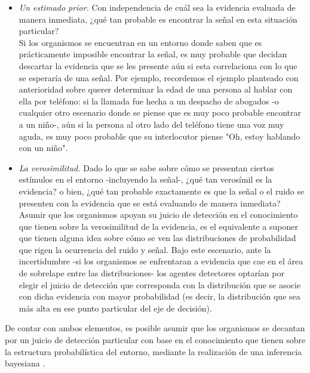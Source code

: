 \begin{itemize}
\item \textsl{Un estimado prior.} Con independencia de cuál sea la evidencia evaluada de manera inmediata, ¿qué tan probable es encontrar la señal en esta situación particular?\\

Si los organismos se encuentran en un entorno donde saben que es prácticamente imposible encontrar la señal, es muy probable que decidan descartar la evidencia que se les presente aún si esta correlaciona con lo que se esperaría de una señal. Por ejemplo, recordemos el ejemplo planteado con anterioridad sobre querer determinar la edad de una persona al hablar con ella por teléfono: si la llamada fue hecha a un despacho de abogados -o cualquier otro escenario donde se piense que es muy poco probable encontrar a un niño-, aún si la persona al otro lado del teléfono tiene una voz muy aguda, es muy poco probable que su interlocutor piense "Oh, estoy hablando con un niño".\\

\item \textsl{La verosimilitud.} Dado lo que se sabe sobre cómo se presentan ciertos estímulos en el entorno -incluyendo la señal-, ¿qué tan verosímil es la evidencia? o bien, ¿qué tan probable exactamente es que la señal o el ruido se presenten con la evidencia que se está evaluando de manera inmediata?\\

Asumir que los organismos apoyan su juicio de detección en el conocimiento que tienen sobre la verosimilitud de la evidencia, es el equivalente a suponer que tienen alguna idea sobre cómo se ven las distribuciones de probabilidad que rigen la ocurrencia del ruido y señal. Bajo este escenario, ante la incertidumbre -si los organismos se enfrentaran a evidencia que cae en el área de sobrelape entre las distribuciones- los agentes detectores optarían por elegir el juicio de detección que corresponda con la distribución que se asocie con dicha evidencia con mayor probabilidad (es decir, la distribución que sea más alta en ese punto particular del eje de decisión).\\
\end{itemize}

De contar con ambos elementos, es posible asumir que los organismos se decantan por un juicio de detección particular con base en el conocimiento que tienen sobre la estructura probabilística del entorno, mediante la realización de una inferencia bayesiana \parencite{WeijiMa}.\\

